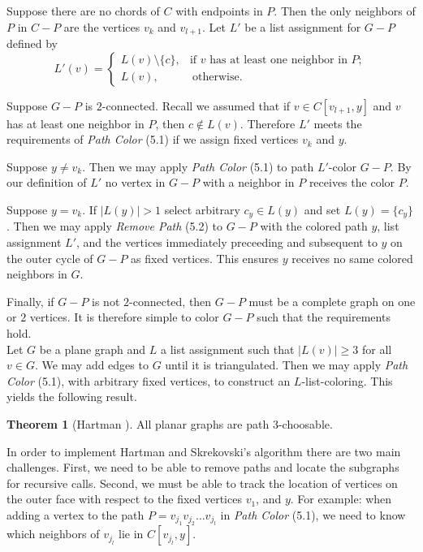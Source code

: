 \documentclass[letterpaper, 12pt]{article}
\theoremstyle{definition}
\theoremstyle{definition}
\theoremstyle{thm}
\newtheorem{theorem}{Theorem}[section]
\theoremstyle{definition}
\begin{document}
Suppose there are no chords of $C$ with endpoints in $P$.
Then the only neighbors of $P$ in $C-P$ are the vertices $v_k$ and $v_{l+1}$.
Let $L'$ be a list assignment for $G-P$ defined by
\[
	L'(v) = \begin{cases}
				L(v)\setminus\{c\}, & \text{if } v \text{ has at least one neighbor in } P;\\
				L(v), & \ \text{otherwise}.
			\end{cases}
\]

Suppose $G-P$ is $2$-connected. Recall we assumed that if $v\in C[v_{l+1},y]$
and $v$ has at least one neighbor in $P$, then $c\not\in L(v)$. Therefore $L'$
meets the requirements of \textit{Path Color} (5.1) if we assign fixed vertices
$v_k$ and $y$.

Suppose $y\ne v_k$. Then we may apply \textit{Path Color} (5.1) to
path $L'$-color $G-P$. By our definition of $L'$ no vertex in $G-P$ with a
neighbor in $P$ receives the color $P$.

Suppose $y=v_k$. If $|L(y)|>1$ select arbitrary $c_y\in L(y)$ and set
$L(y)=\{c_y\}$. Then we may apply \textit{Remove Path} (5.2) to $G-P$ with the
colored path $y$, list assignment $L'$, and the vertices immediately preceeding
and subsequent to $y$ on the outer cycle of $G-P$ as fixed vertices. This
ensures $y$ receives no same colored neighbors in $G$.

Finally, if $G-P$ is not $2$-connected, then $G-P$ must be a complete
graph on one or $2$ vertices. It is therefore simple to color $G-P$ such that
the requirements hold.\\

Let $G$ be a plane graph and $L$ a list assignment such that $|L(v)|\ge 3$
for all $v\in G$. We may add edges to $G$ until it is triangulated. Then
we may apply \textit{Path Color} (5.1), with arbitrary fixed vertices, to
construct an $L$-list-coloring. This yields the following result.

\begin{theorem}[Hartman \cite{hartman}]
All planar graphs are path $3$-choosable.
\end{theorem}

In order to implement Hartman and Skrekovski's algorithm there are two main
challenges. First, we need to be able to remove paths and locate the
subgraphs for recursive calls. Second, we must be able to track the
location of vertices on the outer face with respect to the fixed vertices
$v_1$, and $y$. For example: when adding a vertex to the path
$P=v_{j_1}v_{j_2}\ldots v_{j_l}$ in \textit{Path Color} (5.1), we need to know
which neighbors of $v_{j_l}$ lie in $C[v_{j_l},y]$.
\end{document}

